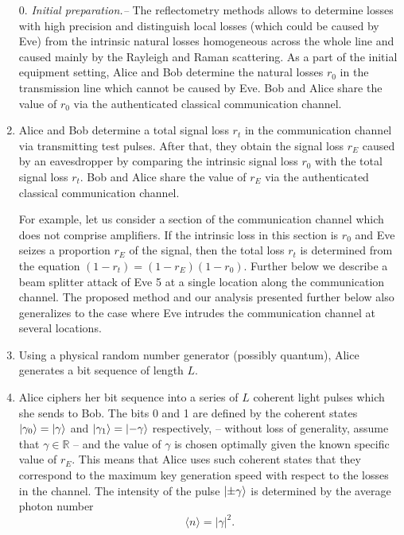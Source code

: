 \documentclass[a4paper]{article}
\begin{document}
\begin{enumerate}
    \item [0.] \textit{Initial preparation.--} The reflectometry methods allows to determine losses with high precision and distinguish local losses (which could be caused by Eve) from the intrinsic natural losses homogeneous across the whole line and caused mainly by the Rayleigh and Raman scattering.
    As a part of the initial equipment setting, Alice and Bob determine the natural losses $r_0$ in the transmission line which cannot be caused by Eve.
    Bob and Alice share the value of $r_0$ via the authenticated classical communication channel.
    
    \item Alice and Bob determine a total signal loss $r_t$ in the communication channel via transmitting test pulses.
    After that, they obtain the signal loss $r_E$ caused by an eavesdropper by comparing the intrinsic signal loss $r_0$ with the total signal loss $r_t$.
    Bob and Alice share the value of $r_E$ via the authenticated classical communication channel.
    
    For example, let us consider a section of the communication channel which does not comprise amplifiers.
    If the intrinsic loss in this section is $r_0$  and Eve seizes a proportion $r_E$ of the signal, then the total loss $r_t$ is determined from the equation $(1-r_t)=(1-r_E)(1-r_0)$. 
    Further below we describe a beam splitter attack of Eve 5 at a single location along the communication channel.
    The proposed method and our analysis presented further below also generalizes to the case where Eve intrudes the communication channel at several locations.
    
    \item Using a physical random number generator (possibly quantum), Alice generates a bit sequence of length $L$.
    
    \item Alice ciphers her bit sequence into a series of $L$ coherent light pulses which she sends to Bob.
    The bits 0 and 1 are defined by the coherent states $\ket{\gamma_0}=\ket{\gamma}$ and $\ket{\gamma_1}=\ket{-\gamma}$ respectively,  -- without loss of generality, assume that $\gamma\in\mathds{R}$ -- and the value of $\gamma$ is chosen optimally given the known specific value of $r_E$.
    This means that Alice uses such coherent states that they correspond to the maximum key generation speed with respect to the losses in the channel.
    The intensity of the pulse $\ket{\pm\gamma}$ is determined by the average photon number 
    \begin{equation}
        \langle n \rangle =|\gamma|^2.
    \end{equation}
    

\end{enumerate}
\end{document}
